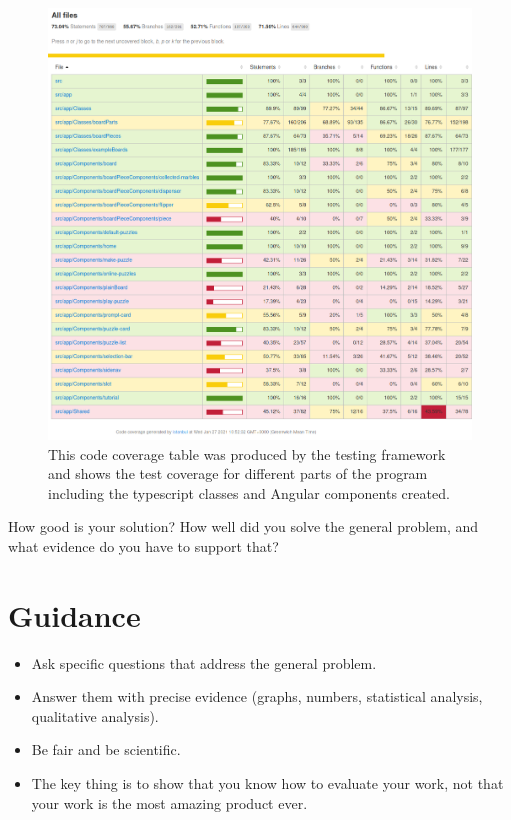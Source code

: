 \documentclass{l4proj}
\begin{document}
\begin{figure}
    \centering
    \includegraphics[width=1\linewidth]{images/codeCoverage.png}    

    \caption{ This code coverage table was produced by the testing framework and shows the test coverage for different parts of the program including the typescript classes and Angular components created. 
    }

    \label{fig:codeCoverage} 
\end{figure}

How good is your solution? How well did you solve the general problem, and what evidence do you have to support that?

\section{Guidance}
\begin{itemize}
    \item
        Ask specific questions that address the general problem.
    \item
        Answer them with precise evidence (graphs, numbers, statistical
        analysis, qualitative analysis).
    \item
        Be fair and be scientific.
    \item
        The key thing is to show that you know how to evaluate your work, not
        that your work is the most amazing product ever.
\end{itemize}
\end{document}
